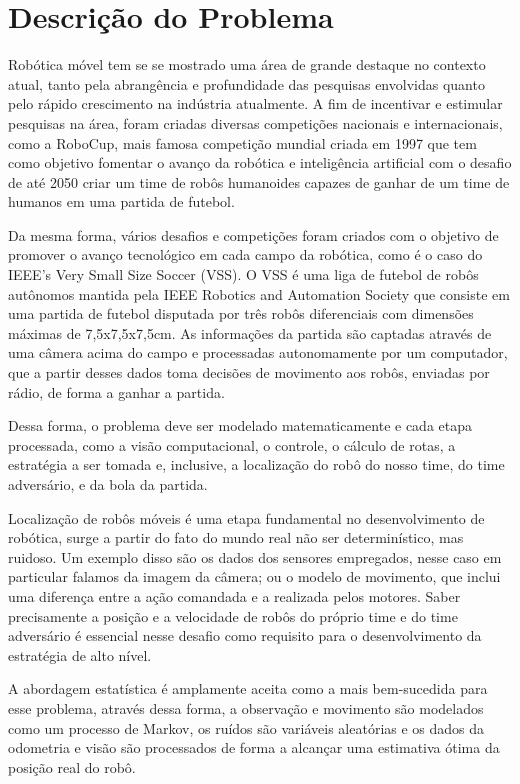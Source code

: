 \documentclass[paper=a4, fontsize=11pt]{scrartcl}
\begin{document}
\section{Descrição do Problema}

Robótica móvel tem se se mostrado uma área de grande destaque no contexto atual, tanto pela abrangência e profundidade das pesquisas envolvidas quanto pelo rápido crescimento na indústria atualmente. A fim de incentivar e estimular pesquisas na área, foram criadas diversas competições nacionais e internacionais, como a RoboCup, mais famosa competição mundial criada em 1997 que tem como objetivo fomentar o avanço da robótica e inteligência artificial com o desafio de até 2050 criar um time de robôs humanoides capazes de ganhar de um time de humanos em uma partida de futebol.

Da mesma forma, vários desafios e competições foram criados com o objetivo de promover o avanço tecnológico em cada campo da robótica, como é o caso do IEEE’s Very Small Size Soccer (VSS). O VSS é uma liga de futebol de robôs autônomos mantida pela IEEE Robotics and Automation Society que consiste em uma partida de futebol disputada por três robôs diferenciais com dimensões máximas de 7,5x7,5x7,5cm. As informações da partida são captadas através de uma câmera acima do campo e processadas autonomamente por um computador, que a partir desses dados toma decisões de movimento aos robôs, enviadas por rádio, de forma a ganhar a partida.

Dessa forma, o problema deve ser modelado matematicamente e cada etapa processada, como a visão computacional, o controle, o cálculo de rotas, a estratégia a ser tomada e, inclusive, a localização do robô do nosso time, do time adversário, e da bola da partida.

Localização de robôs móveis é uma etapa fundamental no desenvolvimento de robótica, surge a partir do fato do mundo real não ser determinístico, mas ruidoso. Um exemplo disso são os dados dos sensores empregados, nesse caso em particular falamos da imagem da câmera; ou o modelo de movimento, que inclui uma diferença entre a ação comandada e a realizada pelos motores. Saber precisamente a posição e a velocidade de robôs do próprio time e do time adversário é essencial nesse desafio como requisito para o desenvolvimento da estratégia de alto nível.

A abordagem estatística é amplamente aceita como a mais bem-sucedida para esse problema, através dessa forma, a observação e movimento são modelados como um processo de Markov, os ruídos são variáveis aleatórias e os dados da odometria e visão são processados de forma a alcançar uma estimativa ótima da posição real do robô.
\end{document}
